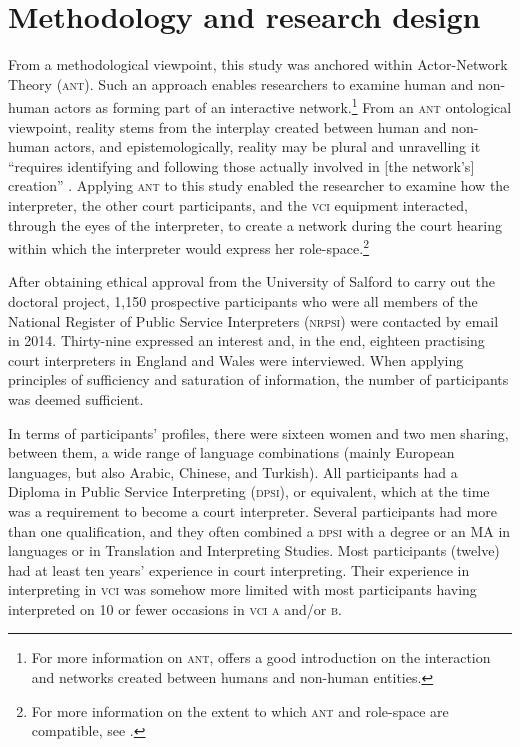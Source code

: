 \documentclass[output=paper]{langsci/langscibook}
\begin{document}
\section{Methodology and research design}
\label{sec:devaux:4}
From a methodological viewpoint, this study was anchored within Actor-Net\-work Theory (\textsc{ant}). Such an approach enables researchers to examine human and non-human actors as forming part of an interactive network.\footnote{For more information on \textsc{ant}, \citet{Latour2005} offers a good introduction on the interaction and networks created between humans and non-human entities.} From an \textsc{ant} ontological viewpoint, reality stems from the interplay created between human and non-human actors, and epistemologically, reality may be plural and unravelling it “requires identifying and following those actually involved in [the network’s] creation” \citep[112]{Bonner2013}. Applying \textsc{ant} to this study enabled the researcher to examine how the interpreter, the other court participants, and the \textsc{vci} equipment interacted, through the eyes of the interpreter, to create a network during the court hearing within which the interpreter would express her role-space.\footnote{For more information on the extent to which \textsc{ant} and role-space are compatible, see \citet{Devaux2017b}.} 

After obtaining ethical approval from the University of Salford to carry out the doctoral project, 1,150 prospective participants who were all members of the National Register of Public Service Interpreters (\textsc{nrpsi}) were contacted by email in 2014. Thirty-nine expressed an interest and, in the end, eighteen practising court interpreters in England and Wales were interviewed. When applying  principles of sufficiency and saturation of information, the number of participants was deemed sufficient. 

In terms of participants’ profiles, there were sixteen women and two men sharing, between them, a wide range of language combinations (mainly European languages, but also Arabic, Chinese, and Turkish). All participants had a Diploma in Public Service Interpreting (\textsc{dpsi}), or equivalent, which at the time was a requirement to become a court interpreter. Several participants had more than one qualification, and they often combined a \textsc{dpsi} with a degree or an MA in languages or in Translation and Interpreting Studies. Most participants (twelve) had at least ten years’ experience in court interpreting. Their experience in interpreting in \textsc{vci} was somehow more limited with most participants having interpreted on 10 or fewer occasions in \textsc{vci a} and/or \textsc{b}.   
\end{document}
